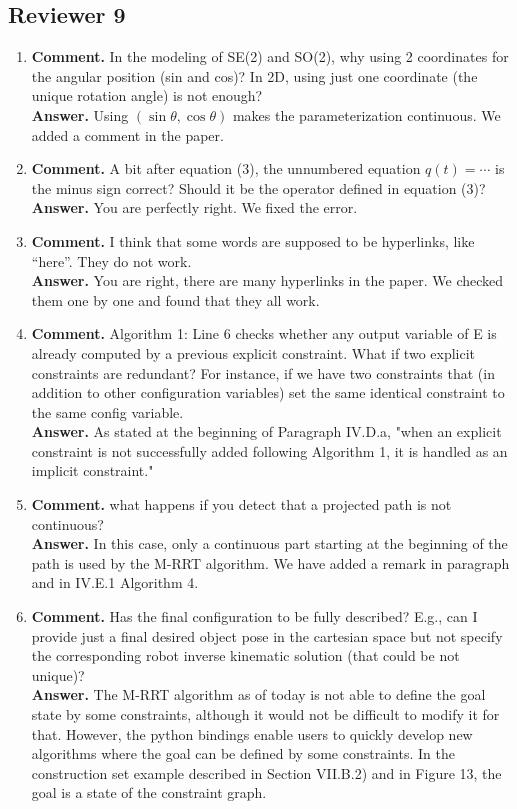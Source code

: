 \documentclass{article}
\begin{document}
\subsection*{Reviewer 9}
\begin{enumerate}
\item \textbf{Comment.} In the modeling of SE(2) and SO(2), why using 2
  coordinates for the angular position (sin and cos)? In 2D, using just one
  coordinate (the unique rotation angle) is not enough?\\
  \textbf{Answer.} Using $(\sin\theta,\cos\theta)$ makes the parameterization
  continuous. We added a comment in the paper.

\item \textbf{Comment.} A bit after equation (3), the unnumbered
  equation $q(t)=\cdots$ is the minus sign correct? Should it be the
  operator defined in equation (3)?
  \textbf{Answer.} You are perfectly right. We fixed the error.

\item \textbf{Comment.} I think that some words are supposed to be
  hyperlinks, like ``here''. They do not work.\\
  \textbf{Answer.} You
  are right, there are many hyperlinks in the paper. We checked them
  one by one and found that they all work.

\item \textbf{Comment.}  Algorithm 1: Line 6 checks whether any output
  variable of E is already computed by a previous explicit
  constraint. What if two explicit constraints are redundant? For
  instance, if we have two constraints that (in addition to other
  configuration variables) set the same identical constraint to the
  same config variable.  \\
  \textbf{Answer.} As stated at the beginning of Paragraph IV.D.a, "when an
  explicit constraint is not successfully added following Algorithm 1, it is
  handled as an implicit constraint."

\item \textbf{Comment.} what happens if you detect that a projected
  path is not continuous?\\
  \textbf{Answer.} In this case, only a
  continuous part starting at the beginning of the path is used by the
  M-RRT algorithm. We have added a remark in paragraph and in IV.E.1
  Algorithm 4.

\item \textbf{Comment.} Has the final configuration to be fully
  described? E.g., can I provide just a final desired object pose in
  the cartesian space but not specify the corresponding robot inverse
  kinematic solution (that could be not unique)?\\
  \textbf{Answer.}
  The M-RRT algorithm as of today is not able to define the goal state
  by some constraints, although it would not be difficult to modify
  it for that. However, the python bindings enable users to quickly develop
  new algorithms where the goal can be defined by some constraints. In the
  construction set example described in Section VII.B.2) and in Figure 13, the
  goal is a state of the constraint graph.  


\end{enumerate}
\end{document}

